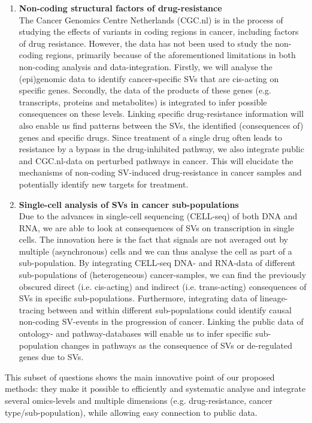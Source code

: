 \documentclass[twoside,fontsize=10pt]{article}
\begin{document}
\begin{enumerate}
\item \textbf{Non-coding structural factors of drug-resistance} \\
The Cancer Genomics Centre Netherlands (CGC.nl) is in the process of studying the effects of variants in coding regions in cancer, including factors of drug resistance. However, the data has not been used to study the non-coding regions, primarily because of the aforementioned limitations in both non-coding analysis and data-integration. Firstly, we will analyse the (epi)genomic data to identify cancer-specific SVs that are cis-acting on specific genes. Secondly, the data of the products of these genes (e.g. transcripts, proteins and metabolites) is integrated to infer possible consequences on these levels. Linking specific drug-resistance information will also enable us find patterns between the SVs, the identified (consequences of) genes and specific drugs. Since treatment of a single drug often leads to resistance by a bypass in the drug-inhibited pathway\cite{Prahallad2012}, we also integrate public and CGC.nl-data on perturbed pathways in cancer. This will elucidate the mechanisms of non-coding SV-induced drug-resistance in cancer samples and potentially identify new targets for treatment.
\item \textbf{Single-cell analysis of SVs in cancer sub-populations} \\
Due to the advances in single-cell sequencing (CELL-seq) of both DNA and RNA, we are able to look at consequences of SVs on transcription in single cells. The innovation here is the fact that signals are not averaged out by multiple (asynchronous) cells and we can thus analyse the cell as part of a sub-population. By integrating CELL-seq DNA- and RNA-data of different sub-populations of (heterogeneous) cancer-samples, we can find the previously obscured direct (i.e. cis-acting) and indirect (i.e. trans-acting) consequences of SVs in specific sub-populations. Furthermore, integrating data of lineage-tracing between and within different sub-populations could identify causal non-coding SV-events in the progression of cancer. Linking the public data of ontology- and pathway-databases will enable us to infer specific sub-population changes in pathways as the consequence of SVs or de-regulated genes due to SVs.
\end{enumerate}
This subset of questions shows the main innovative point of our proposed methods: they make it possible to efficiently and systematic analyse and integrate several omics-levels and multiple dimensions (e.g. drug-resistance, cancer type/sub-population), while allowing easy connection to public data.
\end{document}
